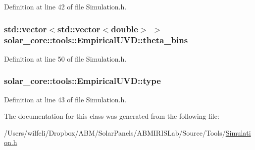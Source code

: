 Definition at line 42 of file Simulation.\+h.

\hypertarget{classsolar__core_1_1tools_1_1_empirical_u_v_d_aa5c9e49cc6e7b7788f9f14256a83d76f}{}
\subsubsection[{theta\+\_\+bins}]{\setlength{\rightskip}{0pt plus 5cm}std\+::vector$<$std\+::vector$<$double$>$ $>$ solar\+\_\+core\+::tools\+::\+Empirical\+U\+V\+D\+::theta\+\_\+bins}\label{classsolar__core_1_1tools_1_1_empirical_u_v_d_aa5c9e49cc6e7b7788f9f14256a83d76f}


Definition at line 50 of file Simulation.\+h.

\hypertarget{classsolar__core_1_1tools_1_1_empirical_u_v_d_a581e5c7f2116d67f5a250725624ff908}{}
\subsubsection[{type}]{ solar\+\_\+core\+::tools\+::\+Empirical\+U\+V\+D\+::type}\label{classsolar__core_1_1tools_1_1_empirical_u_v_d_a581e5c7f2116d67f5a250725624ff908}


Definition at line 43 of file Simulation.\+h.



The documentation for this class was generated from the following file\+:\begin{DoxyCompactItemize}
\item 
/\+Users/wilfeli/\+Dropbox/\+A\+B\+M/\+Solar\+Panels/\+A\+B\+M\+I\+R\+I\+S\+Lab/\+Source/\+Tools/\hyperlink{_simulation_8h}{Simulation.\+h}\end{DoxyCompactItemize}
